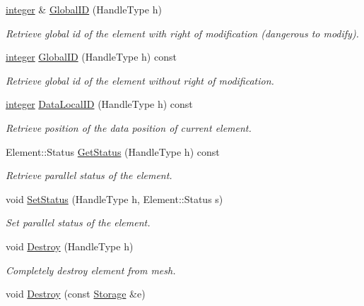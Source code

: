 \begin{DoxyCompactItemize}
\item 
\hyperlink{classINMOST_1_1Storage_aec96942bc647417a801e2895b45964d2}{integer} \& \hyperlink{classINMOST_1_1Mesh_ab9f84a185381a0096fc358e7e2ff5db7}{Global\-I\-D} (Handle\-Type h)
\begin{DoxyCompactList}\small\item\em Retrieve global id of the element with right of modification (dangerous to modify). \end{DoxyCompactList}\item 
\hyperlink{classINMOST_1_1Storage_aec96942bc647417a801e2895b45964d2}{integer} \hyperlink{classINMOST_1_1Mesh_a1c43e6d9cb856c240f084b2f839c2c8c}{Global\-I\-D} (Handle\-Type h) const 
\begin{DoxyCompactList}\small\item\em Retrieve global id of the element without right of modification. \end{DoxyCompactList}\item 
\hyperlink{classINMOST_1_1Storage_aec96942bc647417a801e2895b45964d2}{integer} \hyperlink{classINMOST_1_1Mesh_a2078f4c2589dc14fe6291416ac21050f}{Data\-Local\-I\-D} (Handle\-Type h) const 
\begin{DoxyCompactList}\small\item\em Retrieve position of the data position of current element. \end{DoxyCompactList}\item 
Element\-::\-Status \hyperlink{classINMOST_1_1Mesh_a94963a0f3f1d80ee0785fb8ebd409339}{Get\-Status} (Handle\-Type h) const 
\begin{DoxyCompactList}\small\item\em Retrieve parallel status of the element. \end{DoxyCompactList}\item 
void \hyperlink{classINMOST_1_1Mesh_a666201ee66a5a0f871d17781055b06ac}{Set\-Status} (Handle\-Type h, Element\-::\-Status s)
\begin{DoxyCompactList}\small\item\em Set parallel status of the element. \end{DoxyCompactList}\item 
void \hyperlink{classINMOST_1_1Mesh_a0e2c090ee95e802c4f486a5d98fc6cb0}{Destroy} (Handle\-Type h)
\begin{DoxyCompactList}\small\item\em Completely destroy element from mesh. \end{DoxyCompactList}\item 
\hypertarget{classINMOST_1_1Mesh_a656d48f7478afdc5240295ad97929dab}{void \hyperlink{classINMOST_1_1Mesh_a656d48f7478afdc5240295ad97929dab}{Destroy} (const \hyperlink{classINMOST_1_1Storage}{Storage} \&e)}\label{classINMOST_1_1Mesh_a656d48f7478afdc5240295ad97929dab}


\end{DoxyCompactItemize}
